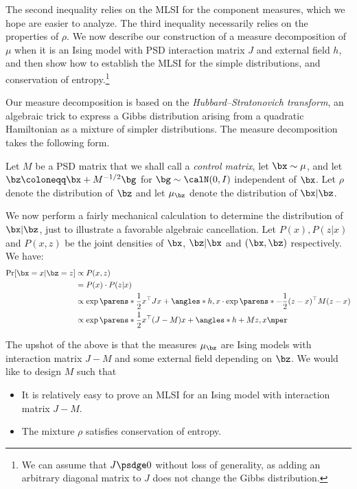 \documentclass[11pt,letterpaper]{article}
\begin{document}
The second inequality relies on the MLSI for the component measures, which we hope are easier to analyze. The third inequality necessarily relies on the properties of $\rho$.
We now describe our construction of a measure decomposition of $\mu$ when it is an Ising model with PSD interaction matrix $J$ and external field $h$, and then show how to establish the MLSI for the simple distributions, and conservation of entropy.\footnote{We can assume that $J\psdge 0$ without loss of generality, as adding an arbitrary diagonal matrix to $J$ does not change the Gibbs distribution.}

Our measure decomposition is based on the \emph{Hubbard--Stratonovich transform}, an algebraic trick to express a Gibbs distribution arising from a quadratic Hamiltonian as a mixture of simpler distributions.
The measure decomposition takes the following form.
\begin{displayquote}
    Let $M$ be a PSD matrix that we shall call a \emph{control matrix}, let $\bx\sim\mu$, and let $\bz \coloneqq \bx + M^{-1/2}\bg$ for $\bg\sim\calN(0, I)$ independent of $\bx$.
    Let $\rho$ denote the distribution of $\bz$ and let $\mu_{\bz}$ denote the distribution of $\bx|\bz$.    
\end{displayquote}
We now perform a fairly mechanical calculation to determine the distribution of $\bx|\bz$, just to illustrate a favorable algebraic cancellation.
Let $P(x), P(z|x)$ and $P(x,z)$ be the joint densities of $\bx$, $\bz|\bx$ and $(\bx,\bz)$ respectively.
We have:
\begin{align*}
    \Pr[\bx = x|\bz = z] &\propto P(x, z) \\
    &= P(x)\cdot P(z|x) \\
    &\propto \exp\parens*{\frac{1}{2}x^{\top}Jx + \angles*{h,x}}\cdot\exp\parens*{-\frac{1}{2}(z-x)^{\top}M(z-x)} \\
    &\propto \exp\parens*{\frac{1}{2}x^{\top}(J-M)x + \angles*{h+Mz, x}}\mper
\end{align*}

The upshot of the above is that the measures $\mu_{\bz}$ are Ising models with interaction matrix $J-M$ and some external field depending on $\bz$.
We would like to design $M$ such that
\begin{itemize}
    \item It is relatively easy to prove an MLSI for an Ising model with interaction matrix $J-M$.
    \item The mixture $\rho$ satisfies conservation of entropy.
\end{itemize}
\end{document}
